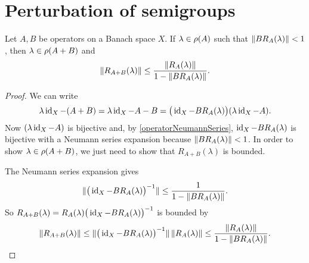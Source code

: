 \section{Perturbation of semigroups}

\begin{lemma} \label{perturbationLemma}
Let $A, B$ be operators on a Banach space $X$. If $\lambda\in\rho(A)$ such that $\lVert BR_A(\lambda)\rVert < 1$, then $\lambda\in \rho(A+B)$ and
\[ \lVert R_{A+B}(\lambda)\rVert \leq \frac{\lVert R_A(\lambda)\rVert}{1- \lVert BR_A(\lambda)\rVert}. \]
\end{lemma}
\begin{proof}
We can write
\[ \lambda\operatorname{id}_X - (A+B) = \lambda\operatorname{id}_X - A-B = \big(\operatorname{id}_X - BR_A(\lambda)\big)(\lambda\operatorname{id}_X - A). \]
Now $(\lambda\operatorname{id}_X - A)$ is bijective and, by \ref{operatorNeumannSeries}, $\operatorname{id}_X - BR_A(\lambda)$ is bijective with a Neumann series expansion because $\lVert BR_A(\lambda)\rVert < 1$. In order to show $\lambda\in\rho(A+B)$, we just need to show that $R_{A+B}(\lambda)$ is bounded.

The Neumann series expansion gives
\[ \lVert\big(\operatorname{id}_X - BR_A(\lambda)\big)^{-1}\rVert \leq \frac{1}{1-\lVert BR_A(\lambda)\rVert}. \]
So $R_{A+B}(\lambda) = R_A(\lambda)\big(\operatorname{id}_X - BR_A(\lambda)\big)^{-1}$ is bounded by
\[ \lVert R_{A+B}(\lambda)\rVert \leq \lVert\big(\operatorname{id}_X - BR_A(\lambda)\big)^{-1}\rVert\,\lVert R_A(\lambda)\rVert \leq \frac{\lVert R_A(\lambda)\rVert}{1-\lVert BR_A(\lambda)\rVert}. \]
\end{proof}

